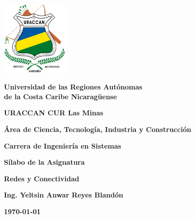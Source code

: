 \documentclass[12pt, letterpaper,titlepage]{report}
\begin{document}
\begin{titlepage}
	\centering
	\includegraphics[width=0.25\textwidth]{img/uraccan_logo.png}\par\vspace{0.5cm}
	\Large\textbf{Universidad de las Regiones Autónomas \\ de la Costa Caribe Nicaragüense}\par\vspace{0.3cm}
	\large\textbf{URACCAN CUR Las Minas}\par\vspace{2cm}

	\large\textbf{Área de Ciencia, Tecnología, Industria y Construcción}\par
	\large\textbf{Carrera de Ingeniería en Sistemas}\par\vspace{3cm}

	\large\textbf{Sílabo de la Asignatura}\par
	\Huge\textbf{Redes y Conectividad}\par\vspace{6cm}

	\large\textbf{Ing. Yeltsin Anwar Reyes Blandón}\par
	\large\textbf{\today}\par\vspace{1cm}
\end{titlepage}







\end{document}
